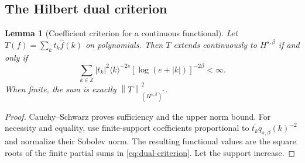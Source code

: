 \documentclass[11pt,a4paper]{article}
\newtheorem{lemma}[theorem]{Lemma}
\theoremstyle{definition}
\theoremstyle{remark}
\newcommand{\Z}{\mathbb Z}
\newcommand{\norm}[1]{\left\lVert#1\right\rVert}
\newcommand{\br}[1]{\langle#1\rangle}
\numberwithin{equation}{section}
\begin{document}
\subsection{The Hilbert dual criterion}
\begin{lemma}[Coefficient criterion for a continuous functional]
\label{lem:dual-criterion}
Let $T(f)=\sum_kt_k\widehat f(k)$ on polynomials. Then $T$ extends
continuously to $H^{s,\beta}$ if and only if
\begin{equation}
 \sum_{k\in\Z}|t_k|^2\br{k}^{-2s}
       [\log(e+|k|)]^{-2\beta}<\infty.
 \label{eq:dual-criterion}
\end{equation}
When finite, the sum is exactly $\norm T_{(H^{s,\beta})^*}^2$.
\end{lemma}
\begin{proof}
Cauchy--Schwarz proves sufficiency and the upper norm bound.
For necessity and equality, use finite-support coefficients proportional
to $\overline{t_k}q_{s,\beta}(k)^{-2}$ and normalize their Sobolev norm.
The resulting functional values are the square roots of the finite partial
sums in \eqref{eq:dual-criterion}. Let the support increase.
\end{proof}
\end{document}
